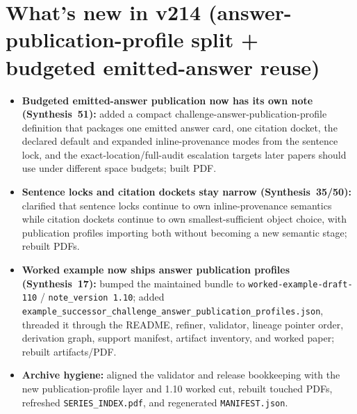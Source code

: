 \documentclass[11pt]{article}
\begin{document}
\section{What's new in v214 (answer-publication-profile split + budgeted emitted-answer reuse)}
\begin{itemize}[leftmargin=*]
\item \textbf{Budgeted emitted-answer publication now has its own note (Synthesis~51):} added a compact challenge-answer-publication-profile definition that packages one emitted answer card, one citation docket, the declared default and expanded inline-provenance modes from the sentence lock, and the exact-location/full-audit escalation targets later papers should use under different space budgets; built PDF.
\item \textbf{Sentence locks and citation dockets stay narrow (Synthesis~35/50):} clarified that sentence locks continue to own inline-provenance semantics while citation dockets continue to own smallest-sufficient object choice, with publication profiles importing both without becoming a new semantic stage; rebuilt PDFs.
\item \textbf{Worked example now ships answer publication profiles (Synthesis~17):} bumped the maintained bundle to \texttt{worked-example-draft-110} / \texttt{note\_version 1.10}; added \texttt{example\_successor\_challenge\_answer\_publication\_profiles.json}, threaded it through the README, refiner, validator, lineage pointer order, derivation graph, support manifest, artifact inventory, and worked paper; rebuilt artifacts/PDF.
\item \textbf{Archive hygiene:} aligned the validator and release bookkeeping with the new publication-profile layer and 1.10 worked cut, rebuilt touched PDFs, refreshed \texttt{SERIES\_INDEX.pdf}, and regenerated \texttt{MANIFEST.json}.
\end{itemize}
\end{document}
